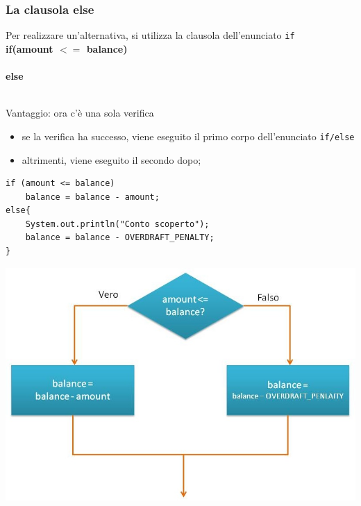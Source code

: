 \begin{frame}
\frametitle{La clausola else}
\begin{block}{}
Per realizzare un'alternativa, si utilizza la clausola \textbf{} dell'enunciato \texttt{if}\\
\textbf{if(amount $<=$ balance)}\\
\hspace{0.7cm} \textbf{}\\
\textbf{\alert{else}}\\
\hspace{0.7cm}\textbf{}\\
\end{block}
\begin{block}{}
Vantaggio: ora c'è una sola verifica
\begin{itemize}
\item se la verifica ha successo, viene eseguito il primo corpo dell'enunciato \texttt{if/else}
\item altrimenti, viene eseguito il secondo dopo;
\end{itemize}
\end{block}
\end{frame}

\begin{frame}[fragile]
\begin{lstlisting}
if (amount <= balance)
    balance = balance - amount;
else{
    System.out.println("Conto scoperto");
    balance = balance - OVERDRAFT_PENALTY;
}
\end{lstlisting}
\begin{center}
\includegraphics[scale=0.35]{images/costruttoIfElse.jpg}
\end{center}
\end{frame}

